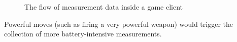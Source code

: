 \begin{figure}[hbtp]
  \caption{
    The flow of measurement data inside a game client
  }
  \label{fig:dataflow}
\end{figure}




Powerful moves (such as firing a very powerful
weapon) would trigger the collection of more battery-intensive measurements.

